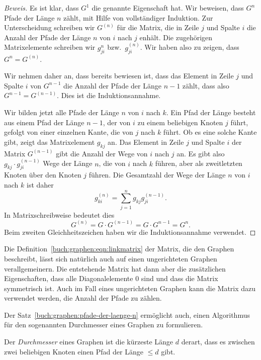 \begin{proof}[Beweis]
Es ist klar, dass $G^1$ die genannte Eigenschaft hat.
Wir beweisen, dass $G^n$ Pfade der Länge $n$ zählt, mit Hilfe von
vollständiger Induktion.
Zur Unterscheidung schreiben wir $G^{(n)}$ für die Matrix, die in Zeile
$j$ und Spalte $i$ die Anzahl der Pfade der Länge $n$ von $i$ nach $j$
enhält.
Die zugehörigen Matrixelemente schreiben wir $g_{ji}^{n}$ bzw.~$g_{ji}^{(n)}$.
Wir haben also zu zeigen, dass $G^n = G^{(n)}$.

Wir nehmen daher an, dass bereits bewiesen ist, dass das Element in Zeile
$j$ und Spalte $i$ von $G^{n-1}$ die Anzahl der Pfade der Länge $n-1$
zählt, dass also $G^{n-1}=G^{(n-1)}$.
Dies ist die Induktionsannahme.

Wir bilden jetzt alle Pfade der Länge $n$ von $i$ nach $k$.
Ein Pfad der Länge besteht aus einem Pfad der Länge $n-1$, der von $i$ zu
einem beliebigen Knoten $j$ führt, gefolgt von einer einzelnen Kante,
die von $j$ nach $k$ führt.
Ob es eine solche Kante gibt, zeigt das Matrixelement $g_{kj}$ an.
Das Element in Zeile $j$ und Spalte $i$ der Matrix $G^{(n-1)}$ gibt
die Anzahl der Wege von $i$ nach $j$ an.
Es gibt also $g_{kj}\cdot g_{ji}^{(n-1)}$ Wege der Länge $n$, die von $i$
nach $k$ führen, aber als zweitletzten Knoten über den Knoten $j$ führen.
Die Gesamtzahl der Wege der Länge $n$ von $i$ nach $k$ ist daher
\[
g_{ki}^{(n)}
=
\sum_{j=1}^n g_{kj} g_{ji}^{(n-1)}.
\]
In Matrixschreibweise bedeutet dies
\[
G^{(n)}
=
G\cdot G^{(n-1)}
=
G\cdot G^{n-1}
=
G^n.
\]
Beim zweiten Gleichheitszeichen haben wir die Induktionsannahme
verwendet.
\end{proof}

Die Definition~\eqref{buch:graphen:eqn:linkmatrix} der Matrix, die den
Graphen beschreibt, lässt sich natürlich auch auf einen ungerichteten
Graphen verallgemeinern.
Die entstehende Matrix hat dann aber die zusätzlichen Eigenschaften, dass
alle Diagonalelemente $0$ sind und dass die Matrix symmetrisch ist.
Auch im Fall eines ungerichteten Graphen kann die Matrix dazu verwendet
werden, die Anzahl der Pfade zu zählen.

Der Satz~\ref{buch:graphen:pfade-der-laenge-n} ermöglicht auch, einen 
Algorithmus für den sogenannten Durchmesser eines Graphen zu formulieren.

\begin{definition}
%
%
Der {\em Durchmesser} eines Graphen ist die kürzeste Länge $d$ derart, dass
es zwischen zwei beliebigen Knoten einen Pfad der Länge $\le d$ gibt.
\end{definition}

